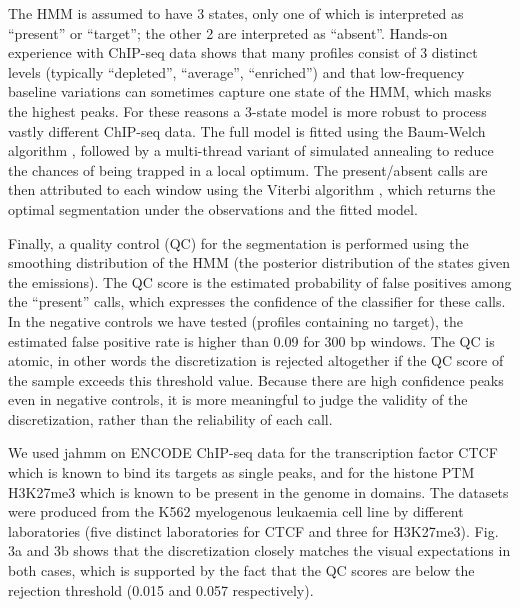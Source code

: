 \documentclass[12pt]{article}
\begin{document}
The HMM is assumed to have 3 states, only one of which is interpreted as ``present'' or ``target''; the other 2 are interpreted as ``absent''. Hands-on experience with ChIP-seq data shows that many profiles consist of 3 distinct levels (typically ``depleted'', ``average'', ``enriched'') and that low-frequency baseline variations can sometimes capture one state of the HMM, which masks the highest peaks. For these reasons a 3-state model is more robust to process vastly different ChIP-seq data. The full model is fitted using the Baum-Welch algorithm \cite{baum1966}, followed by a multi-thread variant of simulated annealing \cite{pmid17813860} to reduce the chances of being trapped in a local optimum. The present/absent calls are then attributed to each window using the Viterbi algorithm \cite{1054010}, which returns the optimal segmentation under the observations and the fitted model.

Finally, a quality control (QC) for the segmentation is performed using the smoothing distribution of the HMM (the posterior distribution of the states given the emissions). The QC score is the estimated probability of false positives among the ``present'' calls, which expresses the confidence of the classifier for these calls. In the negative controls we have tested (profiles containing no target), the estimated false positive rate is higher than 0.09 for 300 bp windows. The QC is atomic, in other words the discretization is rejected altogether if the QC score of the sample exceeds this threshold value. Because there are high confidence peaks even in negative controls, it is more meaningful to judge the validity of the discretization, rather than the reliability of each call.

We used jahmm on ENCODE ChIP-seq data \cite{pmid22955991} for the transcription factor CTCF which is known to bind its targets as single peaks, and for the histone PTM H3K27me3 which is known to be present in the genome in domains. The datasets were produced from the K562 myelogenous leukaemia cell line by different laboratories (five distinct laboratories for CTCF and three for H3K27me3). Fig. 3a and 3b shows that the discretization closely matches the visual expectations in both cases, which is supported by the fact that the QC scores are below the rejection threshold (0.015 and 0.057 respectively).
\end{document}
